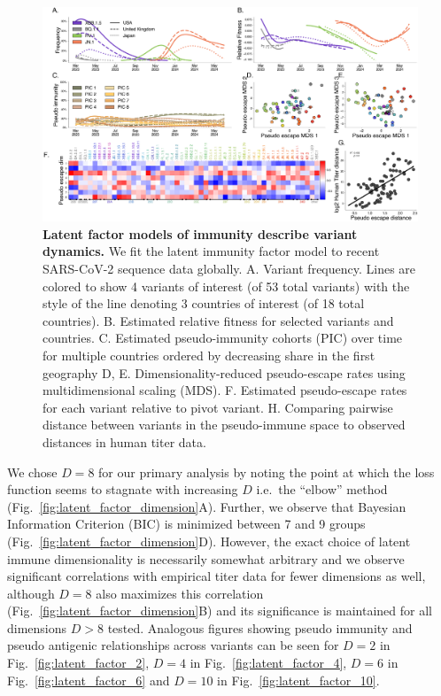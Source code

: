 \documentclass[11pt,oneside,letterpaper]{article}
\def\tbc#1{\textcolor{purple}{[#1]}}
\begin{document}
\begin{figure}[h]
    \centering
    \includegraphics[width=1.0\linewidth]{./figures/latent_immune.png}
    \caption{
      \textbf{Latent factor models of immunity describe variant dynamics.}
      We fit the latent immunity factor model to recent SARS-CoV-2 sequence data globally.
      A. Variant frequency. Lines are colored to show 4 variants of interest (of 53 total variants) with the style of the line denoting 3 countries of interest (of 18 total countries).
      B. Estimated relative fitness for selected variants and countries.
      C. Estimated pseudo-immunity cohorts (PIC) over time for multiple countries ordered by decreasing share in the first geography
      D, E. Dimensionality-reduced pseudo-escape rates using multidimensional scaling (MDS).
      F. Estimated pseudo-escape rates for each variant relative to pivot variant.
      H. Comparing pairwise distance between variants in the pseudo-immune space to observed distances in human titer data.
    }
    \label{fig:latent_immune}
\end{figure}

We chose $D=8$ for our primary analysis by noting the point at which the loss function seems to stagnate with increasing $D$ i.e.\ the ``elbow'' method (Fig.~\ref{fig:latent_factor_dimension}A).
Further, we observe that Bayesian Information Criterion (BIC) is minimized between 7 and 9 groups (Fig.~\ref{fig:latent_factor_dimension}D).
However, the exact choice of latent immune dimensionality is necessarily somewhat arbitrary and we observe significant correlations with empirical titer data for fewer dimensions as well, although $D=8$ also maximizes this correlation (Fig.~\ref{fig:latent_factor_dimension}B) and its significance is maintained for all dimensions $D > 8$ tested.
Analogous figures showing pseudo immunity and pseudo antigenic relationships across variants can be seen for $D=2$ in Fig.~\ref{fig:latent_factor_2}, $D=4$ in Fig.~\ref{fig:latent_factor_4}, $D=6$ in Fig.~\ref{fig:latent_factor_6} and $D=10$ in Fig.~\ref{fig:latent_factor_10}.
\end{document}
